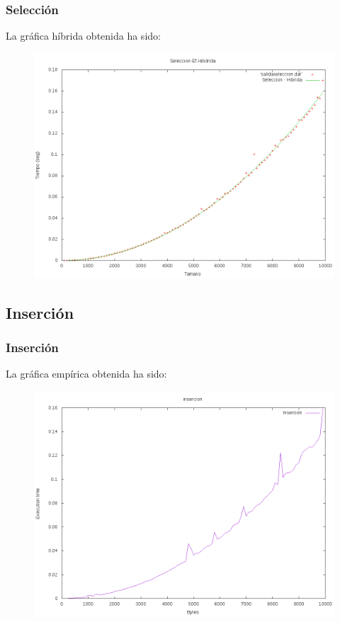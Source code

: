 \documentclass{beamer}
\begin{document}
\begin{frame}
	\frametitle{Selección}
	La gráfica híbrida obtenida ha sido:
	\begin{figure}
		\centering
		\includegraphics[width=0.7\linewidth]{imagenes/seleccion-hibrida.png}
		\caption{}
		\label{fig:E5}
	\end{figure}
	
\end{frame}
\subsection{Inserción}
\begin{frame}
	\frametitle{Inserción}
	La gráfica empírica obtenida ha sido:
	\begin{figure}
		\centering
		\includegraphics[width=0.7\linewidth]{imagenes/insercion.png}
		\caption{}
		\label{fig:E2}
	\end{figure}
	
\end{frame}
\end{document}
